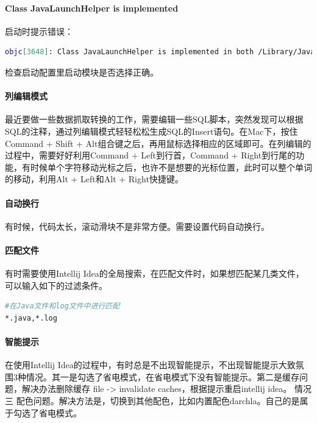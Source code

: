 \documentclass[letter]{book}
\begin{document}
\paragraph{Class JavaLaunchHelper is implemented}


启动时提示错误：

\begin{lstlisting}[language=Bash]
objc[3648]: Class JavaLaunchHelper is implemented in both /Library/Java/JavaVirtualMachines/jdk1.8.0_121.jdk/Contents/Home/bin/java (0x10d19c4c0) and /Library/Java/JavaVirtualMachines/jdk1.8.0_121.jdk/Contents/Home/jre/lib/libinstrument.dylib (0x10ea194e0). One of the two will be used. Which one is undefined.
\end{lstlisting}


检查启动配置里启动模块是否选择正确。

\paragraph{列编辑模式}

最近要做一些数据抓取转换的工作，需要编辑一些SQL脚本，突然发现可以根据SQL的注释，通过列编辑模式轻轻松松生成SQL的Insert语句。在Mac下，按住Command + Shift + Alt组合键之后，再用鼠标选择相应的区域即可。在列编辑的过程中，需要好好利用Command + Left到行首，Command + Right到行尾的功能，有时候单个字符移动光标之后，也许不是想要的光标位置，此时可以整个单词的移动，利用Alt + Left和Alt + Right快捷键。


\paragraph{自动换行}有时候，代码太长，滚动滑块不是非常方便。需要设置代码自动换行。


\paragraph{匹配文件}有时需要使用Intellij Idea的全局搜索，在匹配文件时，如果想匹配某几类文件，可以输入如下的过滤条件。

\begin{lstlisting}[language=Bash]
#在Java文件和log文件中进行匹配
*.java,*.log
\end{lstlisting}

\paragraph{智能提示}

在使用Intellij Idea的过程中，有时总是不出现智能提示，不出现智能提示大致氛围3种情况。其一是勾选了省电模式，在省电模式下没有智能提示。第二是缓存问题，解决办法删除缓存 file -> invalidate caches，根据提示重启intellij idea。 情况三 配色问题。解决方法是，切换到其他配色，比如内置配色darchla。自己的是属于勾选了省电模式。
\end{document}
